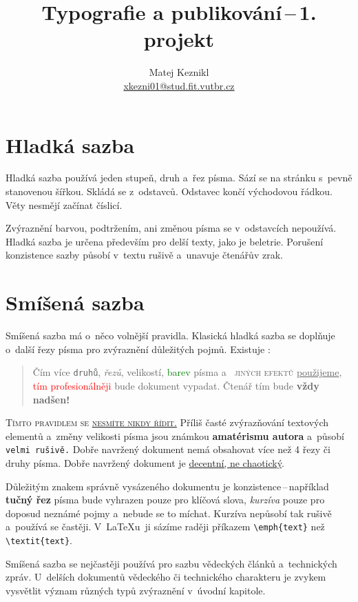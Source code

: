 \documentclass[10pt, a4paper, twocolumn]{article}
\date{}
\title{Typografie a publikování\,--\,1. projekt}
\author{Matej Keznikl \\ \href{mailto:xkezni01@stud.fit.vutbr.cz}{xkezni01@stud.fit.vutbr.cz}}
\begin{document}
\maketitle

\section{Hladká sazba}

Hladká sazba používá jeden stupeň, druh a~řez písma.
Sází se na stránku s~pevně stanovenou šířkou.
Skládá se z~odstavců. Odstavec končí východovou řádkou.
Věty nesmějí začínat číslicí.

Zvýraznění barvou, podtržením, ani změnou písma se v~odstavcích nepoužívá.
Hladká sazba je určena především pro delší texty, jako je beletrie.
Porušení konzistence sazby působí v~textu rušivě a~unavuje čtenářův zrak.

\section{Smíšená sazba}
\label{section: Smisena sazba}

Smíšená sazba má o~něco volnější pravidla.
Klasická hladká sazba se doplňuje o~další řezy písma pro zvýraznění důležitých pojmů.
Existuje :

\begin{quotation}
Čím více \texttt{druhů}, \emph{řezů}, {\tiny velikostí}, \textcolor{green}{barev} písma a~\textsc{\color{blue} jiných efektů} \underline{použijeme}, \textcolor{red}{tím profesionálněji} bude {\selectfont dokument} vypadat.
Čtenář tím bude \textbf{\huge vždy nadšen!}
\end{quotation}

\textsc{Tímto pravidlem se \underline{nesmíte nikdy řídit.}}
Příliš časté zvýrazňování textových elementů a~změny {\scriptsize velikosti} písma jsou známkou \textbf{amatérismu autora} a~působí \texttt{velmi rušivě.}
Dobře navržený dokument nemá obsahovat více než 4 řezy či druhy písma.
Dobře navržený dokument je \underline{decentní, ne chaotický}.

Důležitým znakem správně vysázeného dokumentu je konzistence\,--\,například \textbf{tučný řez} písma bude vyhrazen pouze pro klíčová slova, \emph{kurzíva} pouze pro doposud neznámé pojmy a~nebude se to míchat.
Kurzíva nepůsobí tak rušivě a~používá se častěji.
V~\LaTeX u~ji sázíme raději příkazem \verb|\emph{text}| než \verb|\textit{text}|.

Smíšená sazba se nejčastěji používá pro sazbu vědeckých článků a~technických zpráv.
U~delších dokumentů vědeckého či technického charakteru je zvykem vysvětlit význam různých typů zvýraznění v~úvodní kapitole.
\end{document}
